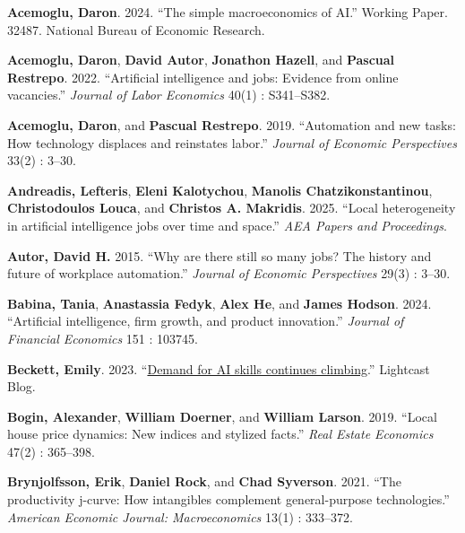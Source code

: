 \documentclass[
]{article}
\newlength{\cslhangindent}
\newenvironment{CSLReferences}[2] %
 {\begin{list}{}{%
  \setlength{\itemindent}{0pt}
  \setlength{\leftmargin}{0pt}
  \setlength{\parsep}{0pt}
  \ifodd #1
   \setlength{\leftmargin}{\cslhangindent}
   \setlength{\itemindent}{-1\cslhangindent}
  \fi
  \setlength{\itemsep}{#2\baselineskip}}}
 {\end{list}}
\begin{document}
\label{refs}
\begin{CSLReferences}{1}{0}
\textbf{Acemoglu, Daron}. 2024. {``The simple macroeconomics of AI.''}
Working Paper. 32487. National Bureau of Economic Research.

\textbf{Acemoglu, Daron}, \textbf{David Autor}, \textbf{Jonathon
Hazell}, and \textbf{Pascual Restrepo}. 2022. {``Artificial intelligence
and jobs: Evidence from online vacancies.''} \emph{Journal of Labor
Economics} 40(1) : S341--S382.

\textbf{Acemoglu, Daron}, and \textbf{Pascual Restrepo}. 2019.
{``Automation and new tasks: How technology displaces and reinstates
labor.''} \emph{Journal of Economic Perspectives} 33(2) : 3--30.

\textbf{Andreadis, Lefteris}, \textbf{Eleni Kalotychou}, \textbf{Manolis
Chatzikonstantinou}, \textbf{Christodoulos Louca}, and \textbf{Christos
A. Makridis}. 2025. {``Local heterogeneity in artificial intelligence
jobs over time and space.''} \emph{AEA Papers and Proceedings}.

\textbf{Autor, David H.} 2015. {``Why are there still so many jobs? The
history and future of workplace automation.''} \emph{Journal of Economic
Perspectives} 29(3) : 3--30.

\textbf{Babina, Tania}, \textbf{Anastassia Fedyk}, \textbf{Alex He}, and
\textbf{James Hodson}. 2024. {``Artificial intelligence, firm growth,
and product innovation.''} \emph{Journal of Financial Economics} 151 :
103745.

\textbf{Beckett, Emily}. 2023. {``\href{https://lightcast.io/}{Demand
for AI skills continues climbing}.''} Lightcast Blog.

\textbf{Bogin, Alexander}, \textbf{William Doerner}, and \textbf{William
Larson}. 2019. {``Local house price dynamics: New indices and stylized
facts.''} \emph{Real Estate Economics} 47(2) : 365--398.

\textbf{Brynjolfsson, Erik}, \textbf{Daniel Rock}, and \textbf{Chad
Syverson}. 2021. {``The productivity j-curve: How intangibles complement
general-purpose technologies.''} \emph{American Economic Journal:
Macroeconomics} 13(1) : 333--372.


\end{CSLReferences}
\end{document}
